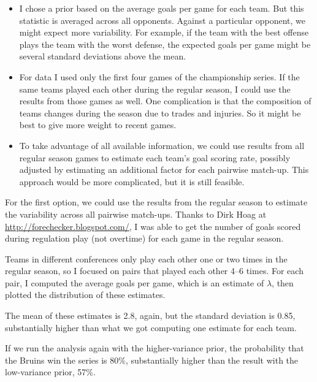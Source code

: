 \documentclass[12pt]{book}
\begin{document}
\begin{itemize}

\item I chose a prior based on the average goals per game for each
  team.  But this statistic is averaged across all opponents.  Against
  a particular opponent, we might expect more variability.  For
  example, if the team with the best offense plays the team with the
  worst defense, the expected goals per game might be several standard
  deviations above the mean.

\item For data I used only the first four games of the championship
  series.  If the same teams played each other during the
  regular season, I could use the results from those games as well.
  One complication is that the composition of teams changes during
  the season due to trades and injuries.  So it might be best to
  give more weight to recent games.

\item To take advantage of all available information, we could
  use results from all regular season games to estimate each team's
  goal scoring rate, possibly adjusted by estimating
  an additional factor for each pairwise match-up.  This approach
  would be more complicated, but it is still feasible.

\end{itemize}

For the first option, we could use the results from the regular season
to estimate the variability across all pairwise match-ups.  Thanks to
Dirk Hoag at \url{http://forechecker.blogspot.com/}, I was able to get
the number of goals scored during regulation play (not overtime) for
each game in the regular season.

Teams in different conferences only play each other one or two
times in the regular season, so I focused on pairs that played
each other 4--6 times.  For each pair, I computed the average
goals per game, which is an estimate of $\lambda$, then plotted
the distribution of these estimates.

The mean of these estimates is 2.8, again, but the standard
deviation is 0.85, substantially higher than what we got computing
one estimate for each team.

If we run the analysis again with the higher-variance prior, the
probability that the Bruins win the series is 80\%, substantially
higher than the result with the low-variance prior, 57\%.
\end{document}
